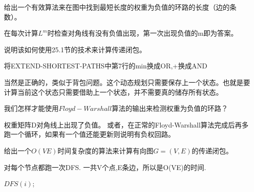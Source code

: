 \documentclass[a4paper, justified]{tufte-handout}
\begin{document}
\begin{problem}[TC 25.1-10]
给出一个有效算法来在图中找到最短长度的权重为负值的环路的长度（边的条数）。
\end{problem}

\begin{solution}
  在每次计算$L^m$时检查对角线有没有负值出现，第一次出现负值的m即为答案。
\end{solution}

\begin{problem}[TC 25.2-2]
说明该如何使用25.1节的技术来计算传递闭包。
\end{problem}

\begin{solution}
  将EXTEND-SHORTEST-PATHS中第7行的min换成OR,+换成AND
\end{solution}

\begin{problem}[TC 25.2-4]
\end{problem}

\begin{solution}
  当然是正确的，类似于背包问题。这个动态规划只需要保存上一个状态。也就是要计算当前这个状态只需要借助上一个状态，并不需要真的储存所有状态。
\end{solution}


\begin{problem}[TC 25.2-6]
我们怎样才能使用$Floyd-Warshall$算法的输出来检测权重为负值的环路？
\end{problem}

\begin{solution}
  权重矩阵D对角线上出现了负值。
  或者，在正常的Floyd-Warshall算法完成后再多跑一个循环，如果有一个值还能更新则说明有负权回路。
\end{solution}

\begin{problem}[TC 25.2-8]
给出一个$O(VE)$时间复杂度的算法来计算有向图$G=(V,E)$的传递闭包。
\end{problem}

\begin{solution}
  对每个节点都跑一次DFS. 一共V个点,E条边，所以是O(VE)的时间.
  \begin{algorithm}[H]
    \begin{algorithmic}[1]
      \State $DFS(i)$;
      \EndFor
      \EndProcedure
    \end{algorithmic}
  \end{algorithm}
\end{solution}
\end{document}
